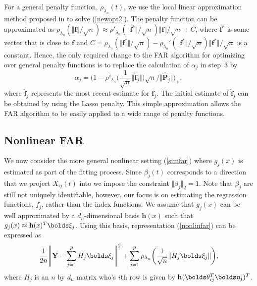 \documentclass[aos,MSNbibl,dvips]{arximspdf}
\newcommand{\rrVert}{\Vert}
\newcommand{\llVert}{\Vert}
\newcommand{\btheta}{\bolds\theta}
\newcommand{\bfeta}{\bolds\eta}
\newcommand{\bxi}{\bolds\xi}
\newcommand{\bY}{{\mathbf Y}}
\newcommand{\bb}{\mathbf{b}}
\newcommand{\bh}{{\mathbf h}}
\newcommand{\bP}{{\mathbf P}}
\newcommand{\bff}{{\mathbf f}}
\newcommand{\hf}{\hat{\bff}}
\begin{document}
For a general penalty function, $\rho_{\lambda_n}(t)$, we use the
local linear approximation method proposed in \cite{ZL08} to solve
(\ref{newopt2}). The penalty function can be approximated as $\rho
_{\lambda_n}(\llVert \bff\rrVert /\sqrt
n)\approx
\rho'_{\lambda_n}(\llVert \bff^*\rrVert /\sqrt n)\llVert \bff
\rrVert /\sqrt n+C$, where
$\bff^*$ is some vector that is close to $\bff$ and $C=\rho_{\lambda
_n}(\llVert \bff^*\rrVert /\sqrt
n)-\rho_{\lambda_n}'(\llVert \bff^*\rrVert /\sqrt n)\llVert \bff
^*\rrVert /\sqrt n$ is a
constant. Hence, the only required change to the FAR algorithm for
optimizing over general penalty
functions is to replace the calculation of $\alpha_j$ in step~3 by
%
\[
\alpha_j = \biggl(1-\rho'_{\lambda_n}\biggl(
\frac{1}{\sqrt{n}}\llVert\hf_j\rrVert\biggr)\sqrt n/\llVert\widehat
\bP_j\rrVert\biggr)_+,
\]
%
where $\hf_j$ represents the most recent estimate for $\bff_j$. The
initial estimate of $\hf_j$ can be obtained by using the Lasso
penalty. This simple
approximation allows the FAR algorithm to be easily applied to a wide
range of penalty functions.

\subsection{Nonlinear FAR}
\label{nlfar}

We now consider the more general nonlinear setting (\ref{simfar})
where $g_j(x)$ is estimated as part of the fitting process. Since
$\beta_j(t)$ corresponds to a direction that we project $X_{ij}(t)$
into we impose the constraint $\llVert \beta_j\rrVert _2=1$. Note
that $\beta_j$
are still not uniquely identifiable, however, our focus is on
estimating the regression functions, $f_j$, rather than the index functions.
%
We assume that $g_j(x)$ can be well
approximated by a $d_n$-dimensional basis $\bh(x)$ such that $g_j(x)
\approx
\bh(x)^T \bxi_j$. Using this basis, representation (\ref{nonlinfar}) can
be expressed as
%
\begin{equation}
\label{nonlinfar2} \frac{1}{2n} \Biggl\llVert\bY-\sum
_{j=1}^p H_j\bxi_j\Biggr
\rrVert^2 + \sum_{j=1}^p
\rho_{\lambda_n} \biggl(\frac{1}{\sqrt n}\llVert H_j
\bxi_j\rrVert\biggr),
\end{equation}
%
where\vspace*{2pt} $H_j$ is an $n$ by $d_n$ matrix who's $i$th row is given by
$\bh(\btheta_{ij}^T \bfeta_j )^T$.
\end{document}
